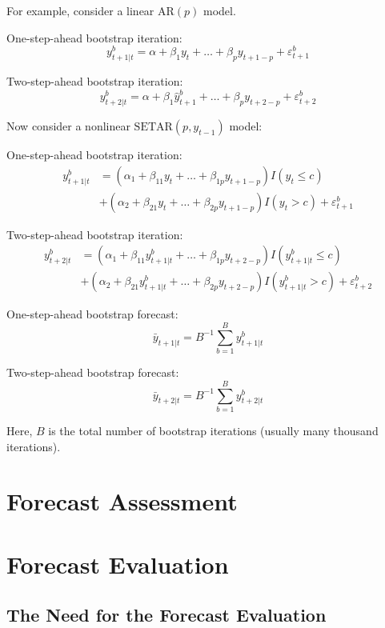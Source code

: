 \documentclass[
  oneside]{book}
\begin{document}
For example, consider a linear \(\text{AR}(p)\) model.

One-step-ahead bootstrap iteration: \[y_{t+1|t}^b = \alpha + \beta_1 y_{t} + \ldots + \beta_p y_{t+1-p}+\varepsilon_{t+1}^b\]

Two-step-ahead bootstrap iteration: \[y_{t+2|t}^b = \alpha + \beta_1 \hat{y}_{t+1}^b + \ldots + \beta_p y_{t+2-p}+\varepsilon_{t+2}^b\]

Now consider a nonlinear \(\text{SETAR}(p,y_{t-1})\) model:

One-step-ahead bootstrap iteration:
\[\begin{aligned}
y_{t+1|t}^b &= (\alpha_1 + \beta_{11} y_{t} + \ldots + \beta_{1p} y_{t+1-p})I(y_{t} \leq c) \\ 
                &+ (\alpha_2 + \beta_{21} y_{t} + \ldots + \beta_{2p} y_{t+1-p})I(y_{t} > c)+\varepsilon_{t+1}^b
\end{aligned}\]

Two-step-ahead bootstrap iteration:
\[\begin{aligned}
y_{t+2|t}^b &= (\alpha_1 + \beta_{11} y_{t+1|t}^b + \ldots + \beta_{1p} y_{t+2-p})I(y_{t+1|t}^b \leq c) \\
                &+ (\alpha_2 + \beta_{21} y_{t+1|t}^b + \ldots + \beta_{2p} y_{t+2-p})I(y_{t+1|t}^b > c)+\varepsilon_{t+2}^b
\end{aligned}\]

One-step-ahead bootstrap forecast: \[\bar{y}_{t+1|t} = B^{-1}\sum_{b=1}^{B}y_{t+1|t}^b\]

Two-step-ahead bootstrap forecast: \[\bar{y}_{t+2|t} = B^{-1}\sum_{b=1}^{B}y_{t+2|t}^b\]

Here, \(B\) is the total number of bootstrap iterations (usually many thousand iterations).

\hypertarget{forecast-assessment}{%
\chapter*{Forecast Assessment}\label{forecast-assessment}}

\hypertarget{forecast-evaluation}{%
\chapter{Forecast Evaluation}\label{forecast-evaluation}}

\hypertarget{the-need-for-the-forecast-evaluation}{%
\section{The Need for the Forecast Evaluation}\label{the-need-for-the-forecast-evaluation}}
\end{document}
